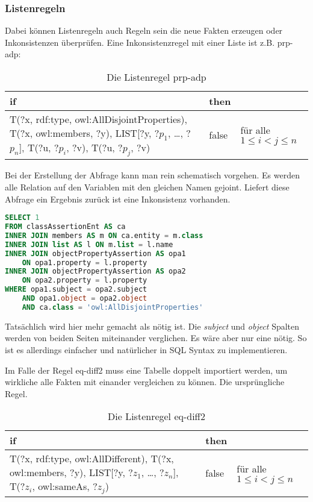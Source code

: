 \subsubsection{Listenregeln}
Dabei können Listenregeln auch Regeln sein die neue Fakten erzeugen oder Inkonsistenzen überprüfen. Eine Inkonsistenzregel mit einer Liste ist z.B. prp-adp:
\begin{table}[htb]
\begin{center}
	\begin{tabular}{M{7.5cm}|M{1.2cm}|M{2.5cm}}
	if & then & \\ \hline
	T(?x, rdf:type, owl:AllDisjointProperties),\newline
	T(?x, owl:members, ?y),\newline
	LIST[?y, ?$p_1$, \ldots, ?$p_n$],\newline
	T(?u, ?$p_i$, ?v),\newline
	T(?u, ?$p_j$, ?v) & false & für alle $1 \leq i < j \leq n$
	\end{tabular}
\end{center}
	\caption{Die Listenregel prp-adp}
	\label{rule-prp-adp}
\end{table}


Bei der Erstellung der Abfrage kann man rein schematisch vorgehen. Es werden alle Relation auf den Variablen mit den gleichen Namen gejoint. Liefert diese Abfrage ein Ergebnis zurück ist eine Inkonsistenz vorhanden.

\begin{lstlisting}[language=SQL]
SELECT 1
FROM classAssertionEnt AS ca
INNER JOIN members AS m ON ca.entity = m.class
INNER JOIN list AS l ON m.list = l.name
INNER JOIN objectPropertyAssertion AS opa1
	ON opa1.property = l.property
INNER JOIN objectPropertyAssertion AS opa2
	ON opa2.property = l.property
WHERE opa1.subject = opa2.subject
	AND opa1.object = opa2.object
	AND ca.class = 'owl:AllDisjointProperties'
\end{lstlisting}

Tatsächlich wird hier mehr gemacht als nötig ist. Die \emph{subject} und \emph{object} Spalten werden von beiden Seiten miteinander verglichen. Es wäre aber nur eine nötig. So ist es allerdings einfacher und natürlicher in SQL Syntax zu implementieren.

Im Falle der Regel eq-diff2 muss eine Tabelle doppelt importiert werden, um wirkliche alle Fakten mit einander vergleichen zu können. Die ursprüngliche Regel.
\begin{table}[htb]
\begin{center}
	\begin{tabular}{M{7cm}|M{1.2cm}|M{2.5cm}}
	if & then & \\ \hline
	T(?x, rdf:type, owl:AllDifferent),\newline
	T(?x, owl:members, ?y),\newline
	LIST[?y, ?$z_1$, \ldots, ?$z_n$],\newline
	T(?$z_i$, owl:sameAs, ?$z_j$) & false & für alle $1 \leq i < j \leq n$
	\end{tabular}
\end{center}
	\caption{Die Listenregel eq-diff2}
	\label{rule-eq-diff2}
\end{table}


